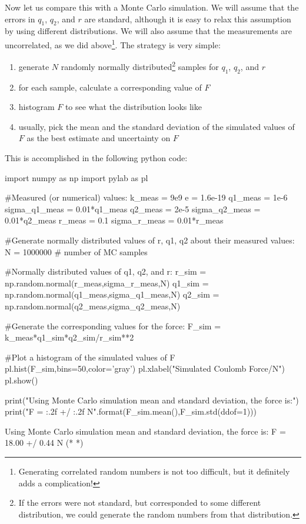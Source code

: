 Now let us compare this with a Monte Carlo simulation. We will assume that the errors in $q_1$, $q_2$, and $r$ are standard, although it is easy to relax this assumption by using different distributions. We will also assume that the measurements are uncorrelated, as we did above\footnote{Generating correlated random numbers is not too difficult, but it definitely adds a complication!}. The strategy is very simple:
\begin{enumerate}
\item generate $N$ randomly normally distributed\footnote{If the errors were not standard, but corresponded to some different distribution, we could generate the random numbers from that distribution.} samples for $q_1$, $q_2$, and $r$
\item for each sample, calculate a corresponding value of $F$
\item histogram $F$ to see what the distribution looks like
\item usually, pick the mean and the standard deviation of the simulated values of $F$ as the best estimate and uncertainty on $F$
\end{enumerate}
This is accomplished in the following python code:
\begin{python}[caption = Monte Carlo error propagation] 
import numpy as np
import pylab as pl

#Measured (or numerical) values:
k_meas = 9e9
e = 1.6e-19
q1_meas = 1e-6
sigma_q1_meas = 0.01*q1_meas
q2_meas = 2e-5
sigma_q2_meas = 0.01*q2_meas
r_meas = 0.1
sigma_r_meas = 0.01*r_meas

#Generate normally distributed values of r, q1, q2 about their measured values:
N = 1000000 # number of MC samples

#Normally distributed values of q1, q2, and r:
r_sim = np.random.normal(r_meas,sigma_r_meas,N)
q1_sim = np.random.normal(q1_meas,sigma_q1_meas,N)
q2_sim = np.random.normal(q2_meas,sigma_q2_meas,N)

#Generate the corresponding values for the force:
F_sim = k_meas*q1_sim*q2_sim/r_sim**2

#Plot a histogram of the simulated values of F
pl.hist(F_sim,bins=50,color='gray')
pl.xlabel("Simulated Coulomb Force/N")
pl.show()

print("Using Monte Carlo simulation mean and standard deviation, the force is:")
print("F = {:.2f} +/ {:.2f} N".format(F_sim.mean(),F_sim.std(ddof=1)))
\end{python}
\begin{poutput}
Using Monte Carlo simulation mean and standard deviation, the force is:
F = 18.00 +/ 0.44 N
(*  *)
\end{poutput}


